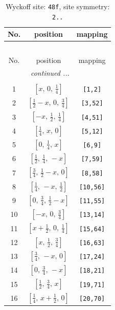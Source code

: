 \documentclass[fleqn,8pt]{jsarticle}
\begin{document}
\begin{longtable}{ccc}
\caption{Wyckoff site: {\tt 48f}, site symmetry: {\tt 2..}}
 \\
 \hline \hline
No. & position & mapping \\ \hline \endfirsthead

\multicolumn{2}{l}{\tablename\ \thetable{}} \\
 \hline \hline
No. & position & mapping \\ \hline \endhead

 \hline \hline
\multicolumn{2}{r}{\footnotesize\it continued ...} \\ \endfoot

 \hline \hline
\multicolumn{2}{r}{} \\ \endlastfoot

1 & $\left[ x,\, 0,\, \frac{1}{4} \right]$ & {\tt [1,2]} \\ \hline
2 & $\left[ \frac{1}{2} - x,\, 0,\, \frac{3}{4} \right]$ & {\tt [3,52]} \\ \hline
3 & $\left[ - x,\, \frac{1}{2},\, \frac{1}{4} \right]$ & {\tt [4,51]} \\ \hline
4 & $\left[ \frac{1}{4},\, x,\, 0 \right]$ & {\tt [5,12]} \\ \hline
5 & $\left[ 0,\, \frac{1}{4},\, x \right]$ & {\tt [6,9]} \\ \hline
6 & $\left[ \frac{1}{2},\, \frac{1}{4},\, - x \right]$ & {\tt [7,59]} \\ \hline
7 & $\left[ \frac{3}{4},\, \frac{1}{2} - x,\, 0 \right]$ & {\tt [8,58]} \\ \hline
8 & $\left[ \frac{1}{4},\, - x,\, \frac{1}{2} \right]$ & {\tt [10,56]} \\ \hline
9 & $\left[ 0,\, \frac{3}{4},\, \frac{1}{2} - x \right]$ & {\tt [11,55]} \\ \hline
10 & $\left[ - x,\, 0,\, \frac{3}{4} \right]$ & {\tt [13,14]} \\ \hline
11 & $\left[ x + \frac{1}{2},\, 0,\, \frac{1}{4} \right]$ & {\tt [15,64]} \\ \hline
12 & $\left[ x,\, \frac{1}{2},\, \frac{3}{4} \right]$ & {\tt [16,63]} \\ \hline
13 & $\left[ \frac{3}{4},\, - x,\, 0 \right]$ & {\tt [17,24]} \\ \hline
14 & $\left[ 0,\, \frac{3}{4},\, - x \right]$ & {\tt [18,21]} \\ \hline
15 & $\left[ \frac{1}{2},\, \frac{3}{4},\, x \right]$ & {\tt [19,71]} \\ \hline
16 & $\left[ \frac{1}{4},\, x + \frac{1}{2},\, 0 \right]$ & {\tt [20,70]} \\ \hline

\end{longtable}
\end{document}
